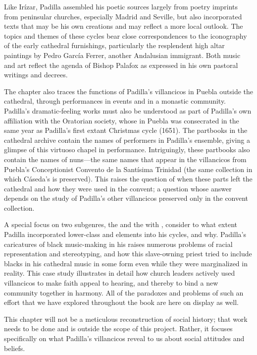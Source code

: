 \documentclass[tt]{vcbook-proposal}
\begin{document}
Like Irízar, Padilla assembled his poetic sources largely from poetry imprints from peninsular churches, especially Madrid and Seville, but also incorporated texts that may be his own creations and may reflect a more local outlook.
The topics and themes of these cycles bear close correspondences to the iconography of the early cathedral furnishings, particularly the resplendent high altar paintings by Pedro García Ferrer, another Andalusian immigrant.
Both  music and art reflect the agenda of Bishop Palafox as expressed in his own pastoral writings and decrees.

The chapter also traces the functions of Padilla's villancicos in Puebla outside the cathedral, through performances in  events and in a monastic community.
Padilla's dramatic-feeling works must also be understood as part of Padilla's own affiliation with the Oratorian society, whose  in Puebla was consecrated in the same year as Padilla's first extant Christmas cycle (1651). 
The partbooks in the cathedral archive contain the names of performers in Padilla's ensemble, giving a glimpse of this virtuoso chapel in performance.
Intriguingly, these partbooks also contain the names of nuns---the same names that appear in the villancicos from Puebla's Conceptionist Convento de la Santísima Trinidad (the same collection in which Cáseda's  is preserved).
This raises the question of when these parts left the cathedral and how they were used in the convent; a question whose answer depends on the study of Padilla's other villancicos preserved only in the convent collection.

A special focus on two subgenres, the  and the  with , consider to what extent Padilla incorporated lower-class and  elements into his cycles, and why.
Padilla's caricatures of black music-making in his  raises numerous problems of racial representation and stereotyping, and how this slave-owning priest tried to include blacks in his cathedral music in some form even while they were marginalized in reality.
This case study illustrates in detail how church leaders actively used villancicos to make faith appeal to hearing, and thereby to bind a new community together in harmony.
All of the paradoxes and problems of such an effort that we have explored throughout the book are here on display as well.

This chapter will not be a meticulous reconstruction of social history; that work needs to be done and is outside the scope of this project.
Rather, it focuses specifically on what Padilla's villancicos reveal to us about social attitudes and beliefs.
\end{document}
